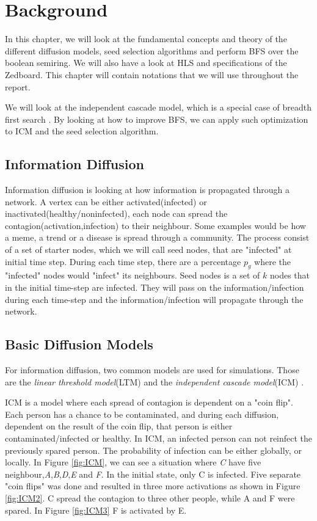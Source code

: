 \chapter{Background} \label{background}

In this chapter, we will look at the fundamental concepts and theory of the different diffusion models, seed selection algorithms and perform BFS over the boolean semiring. We will also have a look at HLS and specifications of the Zedboard. This chapter will contain notations that we will use throughout the report.

 We will look at the independent cascade model, which is a special case of breadth first search  \cite{HybridBFS2015}. By looking at how to improve BFS, we can apply such optimization to ICM and the seed selection algorithm.
 \\
 

\section{Information Diffusion}
Information diffusion is looking at how information is propagated through a network. A vertex can be either activated(infected) or inactivated(healthy/noninfected), each node can spread the contagion(activation,infection) to their neighbour. Some examples would be how a meme, a trend or a disease is spread through a community. The process consist of a set of starter nodes, which we will call seed nodes, that are "infected" at initial time step. During each time step, there are a percentage $p_g$ where the "infected" nodes would "infect" its neighbours. Seed nodes is a set of $k$ nodes that in the initial time-step are infected. They will pass on the information/infection during each time-step and the information/infection will propagate through the network. 

 
\section{Basic Diffusion Models}
For information diffusion, two common models are used for simulations. Those are the \textit{linear threshold model}(LTM) and the \textit{independent cascade model}(ICM) \cite{MaximizeSpread2003}.

ICM is a model where each spread of contagion is dependent on a "coin flip". Each person has a chance to be contaminated, and during each diffusion, dependent on the result of the coin flip, that person is either contaminated/infected or healthy. In ICM, an infected person can not reinfect the previously spared person. The probability of infection can be either globally, or locally. In Figure \ref{fig:ICM}, we can see a situation where \textit{C} have five neighbour,\textit{A},\textit{B},\textit{D},\textit{E} and \textit{F}. In the initial state, only C is infected. Five separate "coin flips" was done and resulted in three more activations as shown in Figure \ref{fig:ICM2}. C spread the contagion to three other people, while A and F were spared. In Figure \ref{fig:ICM3} F is activated by E. 

